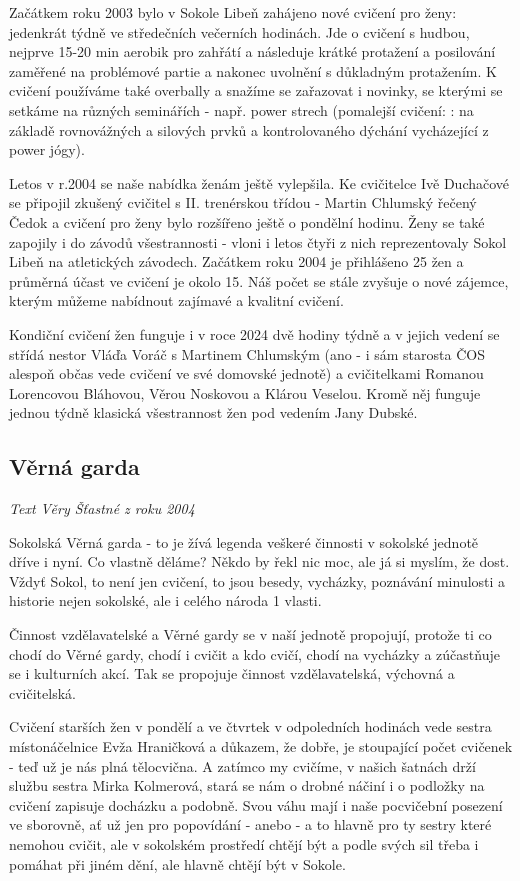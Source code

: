 Začátkem roku 2003 bylo v Sokole Libeň zahájeno nové cvičení pro ženy:
jedenkrát týdně ve středečních večerních hodinách. Jde o cvičení s
hudbou, nejprve 15-20 min aerobik pro zahřátí a následuje krátké
protažení a posilování zaměřené na problémové partie a nakonec uvolnění
s důkladným protažením. K cvičení používáme také overbally a snažíme se
zařazovat i novinky, se kterými se setkáme na různých seminářích - např.
power strech (pomalejší cvičení: : na základě rovnovážných a silových
prvků a kontrolovaného dýchání vycházející z power jógy).

Letos v r.2004 se naše nabídka ženám ještě vylepšila. Ke cvičitelce Ivě
Duchačové se připojil zkušený cvičitel s II. trenérskou třídou - Martin
Chlumský řečený Čedok a cvičení pro ženy bylo rozšířeno ještě o pondělní
hodinu. Ženy se také zapojily i do závodů všestrannosti - vloni i letos
čtyři z nich reprezentovaly Sokol Libeň na atletických závodech.
Začátkem roku 2004 je přihlášeno 25 žen a průměrná účast ve cvičení je
okolo 15. Náš počet se stále zvyšuje o nové zájemce, kterým můžeme
nabídnout zajímavé a kvalitní cvičení.

Kondiční cvičení žen funguje i v roce 2024 dvě hodiny týdně a v jejich
vedení se střídá nestor Vláďa Voráč s Martinem Chlumským (ano - i sám
starosta ČOS alespoň občas vede cvičení ve své domovské jednotě) a
cvičitelkami Romanou Lorencovou Bláhovou, Věrou Noskovou a Klárou
Veselou. Kromě něj funguje jednou týdně klasická všestrannost žen pod
vedením Jany Dubské.

\subsection{Věrná garda}\label{vux11brnuxe1-garda-1}

\emph{Text Věry Šťastné z roku 2004}

Sokolská Věrná garda - to je žívá legenda veškeré činnosti v sokolské
jednotě dříve i nyní. Co vlastně děláme? Někdo by řekl nic moc, ale já
si myslím, že dost. Vždyť Sokol, to není jen cvičení, to jsou besedy,
vycházky, poznávání minulosti a historie nejen sokolské, ale i celého
národa 1 vlasti.

Činnost vzdělavatelské a Věrné gardy se v naší jednotě propojují,
protože ti co chodí do Věrné gardy, chodí i cvičit a kdo cvičí, chodí na
vycházky a zúčastňuje se i kulturních akcí. Tak se propojuje činnost
vzdělavatelská, výchovná a cvičitelská.

Cvičení starších žen v pondělí a ve čtvrtek v odpoledních hodinách vede
sestra místonáčelnice Evža Hraničková a důkazem, že dobře, je stoupající
počet cvičenek - teď už je nás plná tělocvična. A zatímco my cvičíme, v
našich šatnách drží službu sestra Mirka Kolmerová, stará se nám o drobné
náčiní i o podložky na cvičení zapisuje docházku a podobně. Svou váhu
mají i naše pocvičební posezení ve sborovně, ať už jen pro popovídání -
anebo - a to hlavně pro ty sestry které nemohou cvičit, ale v sokolském
prostředí chtějí být a podle svých sil třeba i pomáhat při jiném dění,
ale hlavně chtějí být v Sokole.

